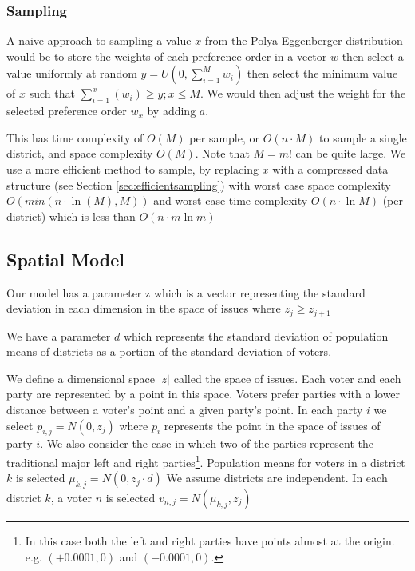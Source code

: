 \documentclass{article}
\begin{document}
\subsubsection{Sampling}
A naive approach to sampling a value $x$ from the Polya Eggenberger distribution would be to store the weights of each preference order in a vector $w$ then select a value uniformly at random $y=U(0,\sum_{i=1}^M w_i)$ then select the minimum value of $x$ such that $\sum_{i=1}^{x}(w_i) \geq y; x \leq M$. We would then adjust the weight for the selected preference order $w_x$ by adding $a$.

This has time complexity of $O(M)$ per sample, or $O(n \cdot M)$ to sample a single district, and space complexity $O(M)$. Note that $M=m!$ can be quite large. We use a more efficient method to sample, by replacing $x$ with a compressed data structure (see Section \ref{sec:efficientsampling}) with worst case space complexity $O(min(n \cdot \ln (M),M))$ and worst case time complexity $O(n \cdot \ln M)$ (per district) which is less than $O(n \cdot m \ln m)$
\subsection{Spatial Model}
\label{sec:spatialmodel}
Our model has a parameter z which is a vector representing the standard deviation in each dimension in the space of issues where $z_j \geq z_{j+1}$


We have a parameter $d$ which represents the standard deviation of population means of districts as a portion of the standard deviation of voters.

We define a dimensional space $|z|$ called the space of issues. Each voter and each party are represented by a point in this space. Voters prefer parties with a lower distance between a voter's point and a given party's point.
In each party $i$ we select $p_{i,j}=N(0,z_j)$ where $p_i$ represents the point in the space of issues of party $i$.
We also consider the case in which two of the parties represent the traditional major left and right parties\footnote{In this case both the left and right parties have points almost at the origin. e.g. $(+0.0001,0)$ and $(-0.0001,0)$.}.
Population means for voters in a district $k$ is selected $\mu_{k,j}=N(0,z_j\cdot d)$ We assume districts are independent.
In each district $k$, a voter $n$ is selected $v_{n,j}=N(\mu_{k,j},z_j)$
\end{document}
